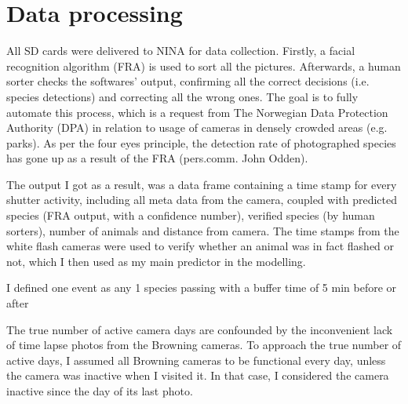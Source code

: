 \section{Data processing} %
All SD cards were delivered to NINA for data collection. Firstly, a facial recognition algorithm (FRA)  is used to sort all the pictures. %
Afterwards, a human sorter checks the softwares' output, confirming all the correct decisions (i.e. species detections) and correcting all the wrong ones.
The goal is to fully automate this process, which is a request from The Norwegian Data Protection Authority (DPA) in relation to usage of cameras in densely crowded areas (e.g. parks).
As per the four eyes principle, the detection rate of photographed species has gone up as a result of the FRA (pers.comm. John Odden). 



The output I got as a result, was a data frame containing a time stamp for every shutter activity, %
including all meta data from the camera, coupled with predicted species (FRA output, with a confidence number), verified species (by human sorters), number of animals and distance from camera. The time stamps from the white flash cameras were used to verify whether an animal was in fact flashed or not, which I then used as my main predictor in the modelling. 


I defined one event as any 1 species passing with a buffer time of 5 min before or after %


The true number of active camera days are confounded by the inconvenient lack of time lapse photos from the Browning cameras. To approach the true number of active days, I assumed all Browning cameras to be functional every day, unless the camera was inactive when I visited it. In that case, I considered the camera inactive since the day of its last photo.



%
%
%
%
%


